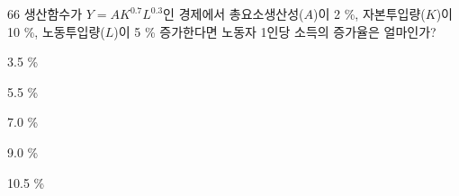 \begin{question}{66}
생산함수가 $Y=AK^{ 0.7 } L^{ 0.3 }$인 경제에서 총요소생산성($A$)이 2 \%, 자본투입량($K$)이 10 \%, 노동투입량($L$)이 5 \% 증가한다면 노동자 1인당 소득의 증가율은 얼마인가?
\begin{choices}
  \item 3.5 \%
  \item 5.5 \%
  \item 7.0 \%
  \item 9.0 \%
  \item 10.5 \%
\end{choices}
\end{question}
